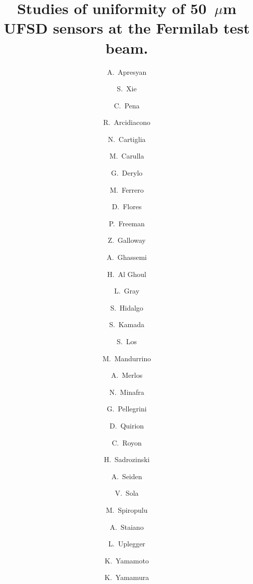 \documentclass[preprint,1p]{elsarticle}
\begin{document}
\linenumbers

\begin{frontmatter}



\title{Studies of uniformity of 50~$\mu$m UFSD sensors at the Fermilab test beam.}


\author[1]{A.~Apresyan}
\author[2]{S.~Xie}
\author[2]{C.~Pena}
\author[5,7]{R.~Arcidiacono}
\author[5]{N.~Cartiglia}
\author[8]{M.~Carulla}
\author[1]{G.~Derylo}
\author[5]{M.~Ferrero}
\author[8]{D.~Flores}
\author[4]{P.~Freeman}
\author[4]{Z.~Galloway}
\author[9]{A.~Ghassemi}
\author[3]{H.~Al Ghoul}
\author[1]{L.~Gray}
\author[8]{S.~Hidalgo}
\author[9]{S.~Kamada}
\author[1]{S.~Los}
\author[5]{M.~Mandurrino}
\author[8]{A.~Merlos}
\author[3]{N.~Minafra}
\author[8]{G.~Pellegrini}
\author[8]{D.~Quirion}
\author[3]{C.~Royon}
\author[4]{H.~Sadrozinski}
\author[4]{A.~Seiden}
\author[5]{V.~Sola}
\author[2]{M.~Spiropulu}
\author[5]{A.~Staiano}
\author[1]{L.~Uplegger}
\author[9]{K.~Yamamoto}
\author[9]{K.~Yamamura}

\address[1]{Fermi National Accelerator Laboratory, Batavia, IL, USA}
\address[2]{California Institute of Technology, Pasadena, CA, USA}
\address[3]{University of Kansas, KS, USA}
\address[4]{SCIPP, University of California Santa Cruz, CA, USA}
\address[5]{INFN, Torino, Italy}
\address[6]{Universit\`a di Torino, Torino, Italy}
\address[7]{Universit\`a del Piemonte Orientale, Italy}
\address[8]{Centro Nacional de Microelectr\`onica (IMB-CNM-CSIC), Barcelona, Spain}
\address[9]{Hamamatsu Photonics (HPK), Hamamatsu, Japan}


\end{frontmatter}
\end{document}
